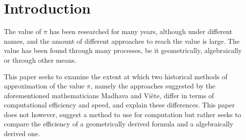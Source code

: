 \section{Introduction}


The value of $\pi$ has been researched for many years, although under different names,
and the amount of different approaches to reach the value is large. The value has been 
found through many processes, be it geometrically, algebraically 
or through other means. 

This paper seeks to examine the extent at which two historical methods of
approximation of the value $\pi$, namely the approaches suggested by the aforementioned 
mathematicians Madhava and Viète, differ in terms of computational efficiency and 
speed, and explain these differences. This paper does not however, 
suggest a method to use for computation but rather seeks to compare the efficiency of
a geometrically derived formula and a algebraically derived one. 